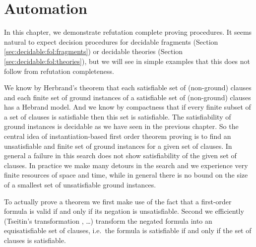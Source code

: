 
\chapter{Automation}



In this chapter, we demonstrate refutation complete proving procedures.
It seems natural to expect decision procedures for decidable fragments 
(Section \ref{sec:decidable:fol:fragments})
or decidable theories (Section \ref{sec:decidable:fol:theories}),
but we will see in simple examples that this does not follow 
from refutation completeness.


%
We know by Herbrand's theorem 
that each satisfiable set of (non-ground) clauses
and each finite set of ground instances of a satisfiable set of (non-ground) clauses
has a Hebrand model. 
And we know by compactness 
that if every finite subset of a set of clauses is satisfiable then this set is satisfiable.
The satisfiability of ground instances is decidable as we have seen in the previous chapter.
So the central idea of instantiation-based first order theorem proving 
is to find an unsatisfiable and finite set of ground instances for a given set of clauses.
In general a failure in this search does not show satisfiability of the given set of clauses.
In practice we make many detours in the search and we experience very finite resources of space and time, 
while in general there is no bound on the size of a smallest set of unsatisfiable ground instances.



To actually prove a theorem 
we first make use of the fact that a first-order formula is valid if and only if its negation is unsatisfiable.
Second we efficiently (Tseitin's transformation \cite{tseitin70}, \ldots) transform the negated formula into an {\myem equisatisfiable} set of clauses,
i.e.~the formula is satisfiable if and only if the set of clauses is satisfiable.



